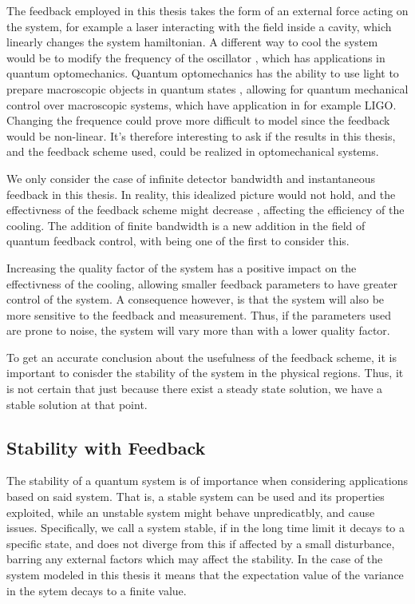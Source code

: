 The feedback employed in this thesis takes the form of an external force acting on the system, for example a laser interacting with the field inside a cavity, which linearly changes the system hamiltonian. A different way to cool the system would be to modify the frequency of the oscillator \cite{Habibi:2016}, which has applications in quantum optomechanics. Quantum optomechanics has the ability to use light to prepare macroscopic objects in quantum states \cite{Chen:2013}, allowing for quantum mechanical control over macroscopic systems, which have application in for example LIGO. Changing the frequence could prove more difficult to model since the feedback would be non-linear. It's therefore interesting to ask if the results in this thesis, and the feedback scheme used, could be realized in optomechanical systems. 

We only consider the case of infinite detector bandwidth and instantaneous feedback in this thesis. In reality, this idealized picture would not hold, and the effectivness of the feedback scheme might decrease \cite{Annby-Andersson:2024}, affecting the efficiency of the cooling. The addition of finite bandwidth is a new addition in the field of quantum feedback control, with \cite{De-Sousa:2025} being one of the first to consider this. 

Increasing the quality factor of the system has a positive impact on the effectivness of the cooling, allowing smaller feedback parameters to have greater control of the system. A consequence however, is that the system will also be more sensitive to the feedback and measurement. Thus, if the parameters used are prone to noise, the system will vary more than with a lower quality factor.

To get an accurate conclusion about the usefulness of the feedback scheme, it is important to conisder the stability of the system in the physical regions. Thus, it is not certain that just because there exist a steady state solution, we have a stable solution at that point.



\subsection{Stability with Feedback}
The stability of a quantum system is of importance when considering applications based on said system. That is, a stable system can be used and its properties exploited, while an unstable system might behave unpredicatbly, and cause issues. Specifically, we call a system stable, if in the long time limit it decays to a specific state, and does not diverge from this if affected by a small disturbance, barring any external factors which may affect the stability. In the case of the system modeled in this thesis it means that the expectation value of the variance in the sytem decays to a finite value.

